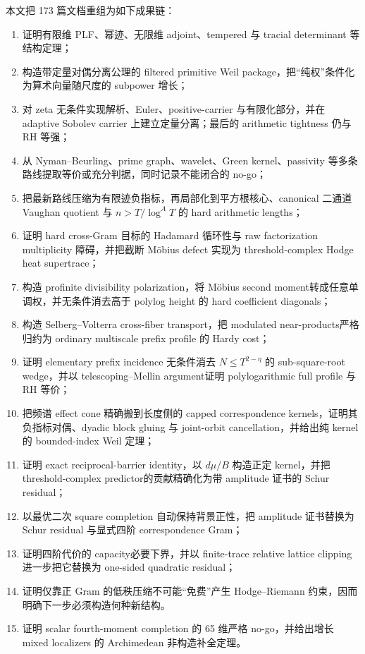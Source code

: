 \documentclass[UTF8,11pt,a4paper]{ctexart}
\theoremstyle{definition}
\theoremstyle{remark}
\newcommand{\1}{\mathbf 1}
\begin{document}
本文把 173 篇文档重组为如下成果链：
\begin{enumerate}
  \item 证明有限维 PLF、幂迹、无限维 adjoint、tempered 与 tracial determinant 等结构定理；
  \item 构造带定量对偶分离公理的 filtered primitive Weil package，把“纯权”条件化为算术向量随尺度的 subpower 增长；
  \item 对 zeta 无条件实现解析、Euler、positive-carrier 与有限化部分，并在 adaptive Sobolev carrier 上建立定量分离；最后的 arithmetic tightness 仍与 RH 等强；
  \item 从 Nyman--Beurling、prime graph、wavelet、Green kernel、passivity 等多条路线提取等价或充分判据，同时记录不能闭合的 no-go；
  \item 把最新路线压缩为有限迹负指标，再局部化到平方根核心、canonical 二通道 Vaughan quotient 与 $n>T/\log^A T$ 的 hard arithmetic lengths；
  \item 证明 hard cross-Gram 目标的 Hadamard 循环性与 raw factorization multiplicity 障碍，并把截断 M\"obius defect 实现为 threshold-complex Hodge heat supertrace；
  \item 构造 profinite divisibility polarization，将 M\"obius second moment转成任意单调权，并无条件消去高于 polylog height 的 hard coefficient diagonals；
  \item 构造 Selberg--Volterra cross-fiber transport，把 modulated near-products严格归约为 ordinary multiscale prefix profile 的 Hardy cost；
  \item 证明 elementary prefix incidence 无条件消去 $N\leq T^{2-\eta}$ 的 sub-square-root wedge，并以 telescoping--Mellin argument证明 polylogarithmic full profile 与 RH 等价；
  \item 把频谱 effect cone 精确搬到长度侧的 capped correspondence kernels，证明其负指标对偶、dyadic block gluing 与 joint-orbit cancellation，并给出纯 kernel 的 bounded-index Weil 定理；
  \item 证明 exact reciprocal-barrier identity，以 $d\mu/B$ 构造正定 kernel，并把 threshold-complex predictor的贡献精确化为带 amplitude 证书的 Schur residual；
  \item 以最优二次 square completion 自动保持背景正性，把 amplitude 证书替换为 Schur residual 与显式四阶 correspondence Gram；
  \item 证明四阶代价的 capacity必要下界，并以 finite-trace relative lattice clipping进一步把它替换为 one-sided quadratic residual；
  \item 证明仅靠正 Gram 的低秩压缩不可能“免费”产生 Hodge--Riemann 约束，因而明确下一步必须构造何种新结构。
  \item 证明 scalar fourth-moment completion 的 65 维严格 no-go，并给出增长 mixed localizers 的 Archimedean 非构造补全定理。
\end{enumerate}
\end{document}
